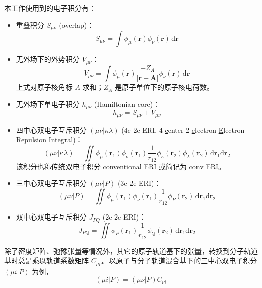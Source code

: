 本工作使用到的电子积分有：
\begin{itemize}[nosep]
  \item 重叠积分 $S_{\mu \nu}$ (overlap)：
        \begin{equation}
          S_{\mu \nu} = \int \phi_\mu (\bm{r}) \phi_\nu (\bm{r}) \, \mathrm{d} \bm{r}
        \end{equation}
  \item 无外场下的外势积分 $V_{\mu \nu}$：
        \begin{equation}
          V_{\mu \nu} = \int \phi_\mu (\bm{r}) \frac{- Z_A}{|\bm{r} - \bm{A}|} \phi_\nu (\bm{r}) \, \mathrm{d} \bm{r}
        \end{equation}
        上式对原子核角标 $A$ 求和；$Z_A$ 是原子单位下的原子核电荷数。
  \item 无外场下单电子积分 $h_{\mu \nu}$ (Hamiltonian core)：
        \begin{equation}
          h_{\mu \nu} = S_{\mu \nu} + V_{\mu \nu}
        \end{equation}
  \item 四中心双电子互斥积分 $(\mu \nu | \kappa \lambda)$ (4c-2e ERI, 4-\underline{c}enter 2-\underline{e}lectron \underline{E}lectron \underline{R}epulsion \underline{I}ntegral)：
        \begin{equation}
          (\mu \nu | \kappa \lambda) = \iint \phi_\mu (\bm{r}_1) \phi_\nu (\bm{r}_1) \frac{1}{r_{12}} \phi_\kappa (\bm{r}_2) \phi_\lambda (\bm{r}_2) \, \mathrm{d} \bm{r}_1 \mathrm{d} \bm{r}_2
        \end{equation}
        该积分也称传统双电子积分 conventional ERI 或简记为 conv ERI。
  \item 三中心双电子互斥积分 $(\mu \nu | P)$ (3c-2e ERI)：
        \begin{equation}
          (\mu \nu | P) = \iint \phi_\mu (\bm{r}_1) \phi_\nu (\bm{r}_1) \frac{1}{r_{12}} \phi_P (\bm{r}_2) \, \mathrm{d} \bm{r}_1 \mathrm{d} \bm{r}_2
        \end{equation}
  \item 双中心双电子互斥积分 $J_{PQ}$ (2c-2e ERI)：
        \begin{equation}
          J_{PQ} = \iint \phi_P (\bm{r}_1) \frac{1}{r_{12}} \phi_Q (\bm{r}_2) \, \mathrm{d} \bm{r}_1 \mathrm{d} \bm{r}_2
        \end{equation}
\end{itemize}

除了密度矩阵、弛豫张量等情况外，其它的原子轨道基下的张量，转换到分子轨道基时总是乘以轨道系数矩阵 $C_{\mu p}$。以原子与分子轨道混合基下的三中心双电子积分 $(\mu i | P)$ 为例，
\begin{equation*}
  (\mu i | P) = (\mu \nu | P) C_{\nu i}
\end{equation*}

